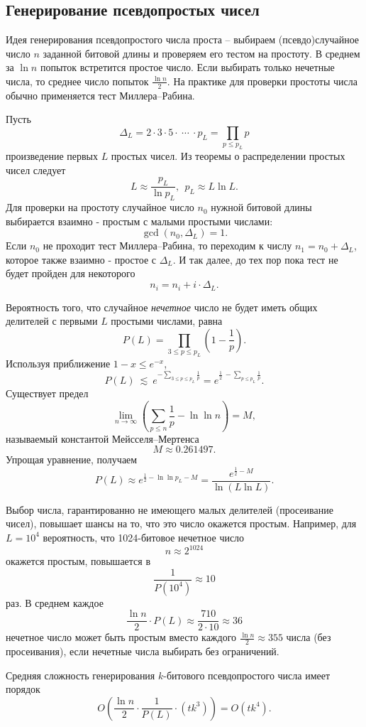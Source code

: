 \subsection{Генерирование псевдопростых чисел}

Идея генерирования псевдопростого числа проста -- выбираем (псевдо)случайное число $n$ заданной битовой длины и проверяем его тестом на простоту. В среднем за $\ln n$ попыток встретится простое число. Если выбирать только нечетные числа, то среднее число попыток $\frac{\ln n}{2}$. На практике для проверки простоты числа обычно применяется тест Миллера--Рабина.

Пусть
    \[ \Delta_L = 2 \cdot 3 \cdot 5 \cdot ~\cdots~ \cdot p_L = \prod \limits_{p \leq p_L} p \]
произведение первых $L$ простых чисел. Из теоремы о распределении простых чисел следует
    \[ L \approx \frac{p_L}{\ln p_L}, ~~ p_L \approx L \ln L. \]
Для проверки на простоту случайное число $n_0$ нужной битовой длины выбирается взаимно - простым с малыми простыми числами:
    \[ \gcd(n_0, \Delta_L) = 1. \]
Если $n_0$ не проходит тест Миллера--Рабина, то переходим к числу $n_1 = n_0 + \Delta_L$, которое также взаимно - простое с $\Delta_L$. И так далее, до тех пор пока тест не будет пройден  для некоторого
    \[ n_i = n_i + i \cdot \Delta_L. \]

Вероятность того, что случайное \textit{нечетное} число не будет иметь общих делителей с первыми $L$ простыми числами, равна
    \[ P(L) = \prod \limits_{3 \leq p \leq p_L} \left( 1 - \frac{1}{p} \right). \]
Используя приближение $1-x \leq e^{-x}$,
    \[ P(L) ~\lesssim~ e^{-\sum\limits_{3 \leq p \leq p_L} \frac{1}{p}} = e^{\frac{1}{2} ~ - \sum\limits_{p \leq p_L} \frac{1}{p}}. \]
Существует предел
    \[ \lim \limits_{n \rightarrow \infty} \left( \sum \limits_{p \leq n} \frac{1}{p} - \ln \ln n \right) = M, \]
называемый константой Мейсселя--Мертенса
    \[ M \approx 0.261497. \]
Упрощая уравнение, получаем
    \[ P(L) \approx e^{\frac{1}{2} - \ln \ln p_L - M} = \frac{e^{\frac{1}{2} - M}}{\ln(L \ln L)}. \]

Выбор числа, гарантированно не имеющего малых делителей (просеивание чисел), повышает шансы на то, что это число окажется простым. Например, для $L = 10^4$ вероятность, что 1024-битовое нечетное число
    \[ n \approx 2^{1024} \]
окажется простым, повышается в
    \[ \frac{1}{P(10^4)} \approx 10 \]
раз. В среднем каждое
    \[ \frac{\ln n}{2} \cdot P(L) \approx \frac{710}{2 \cdot 10} \approx 36 \]
нечетное число может быть простым вместо каждого $\frac{\ln n}{2} \approx 355$ числа (без просеивания), если нечетные числа выбирать без ограничений.

Средняя сложность генерирования $k$-битового псевдопростого числа имеет порядок
    \[ O \left( \frac{\ln n}{2} \cdot \frac{1}{P(L)} \cdot \left( t k^3 \right) \right) = O(t k^4). \]
